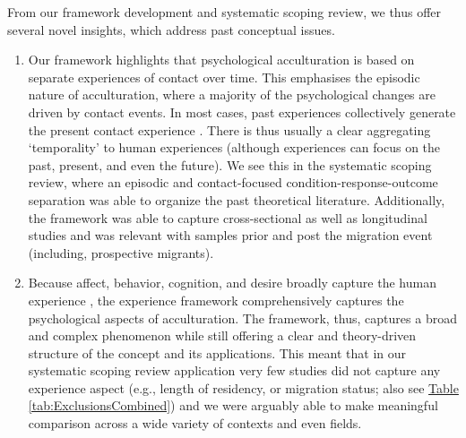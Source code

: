 \documentclass[man, 12pt, a4paper, mask]{apa7}
\newcommand{\tblref}[2][]{\hyperref[#2]{Table \ref*{#2}#1}}
\begin{document}
From our framework development and systematic scoping review, we thus offer several novel insights, which address past conceptual issues.

\begin{enumerate}
\item Our framework highlights that psychological acculturation is based on separate experiences of contact over time. This emphasises the episodic nature of acculturation, where a majority of the psychological changes are driven by contact events. In most cases, past experiences collectively generate the present contact experience \citep[also see][]{Husserl1959, Heidegger1978}. There is thus usually a clear aggregating `temporality' to human experiences (although experiences can focus on the past, present, and even the future). We see this in the systematic scoping review, where an episodic and contact-focused condition-response-outcome separation was able to organize the past theoretical literature. Additionally, the framework was able to capture cross-sectional as well as longitudinal studies and was relevant with samples prior and post the migration event (including, prospective migrants). 

\item Because affect, behavior, cognition, and desire broadly capture the human experience \citep[e.g.,][]{Jhangiani2014}, the experience framework comprehensively captures the psychological aspects of acculturation. The framework, thus, captures a broad and complex phenomenon while still offering a clear and theory-driven structure of the concept and its applications. This meant that in our systematic scoping review application very few studies did not capture any experience aspect (e.g., length of residency, or migration status; also see \tblref{tab:ExclusionsCombined}) and we were arguably able to make meaningful comparison across a wide variety of contexts and even fields.


\end{enumerate}
\end{document}
